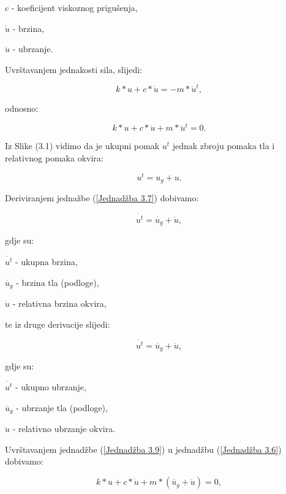 \documentclass[12pt]{book}
\begin{document}
$c$ - koeficijent viskoznog prigušenja,

$\dot{u}$ - brzina,

$\ddot{u}$ - ubrzanje.

\newpage

Uvrštavanjem jednakosti sila, slijedi:

\begin{equation}\label{Jednadžba 3.5}
	k*u + c*\dot{u} = - m*\ddot{u}^t,
\end{equation}

odnosno:

\begin{equation}\label{Jednadžba 3.6}
	k*u + c*\dot{u} + m*\ddot{u}^t =0.
\end{equation}

Iz Slike (3.1) vidimo da je ukupni pomak $u^t$ jednak zbroju pomaka tla i relativnog pomaka okvira:

\begin{equation}\label{Jednadžba 3.7}
	u^t = u_g + u.
\end{equation}

Deriviranjem jednažbe (\ref{Jednadžba 3.7}) dobivamo:

\begin{equation}\label{Jednadžba 3.8}
	\dot{u^t} = \dot{u_g} + \dot{u},
\end{equation}

gdje su:

$\dot{u^t}$ - ukupna brzina,

$\dot{u_g}$ - brzina tla (podloge),

$\dot{u}$ - relativna brzina okvira,

te iz druge derivacije slijedi:

\begin{equation}\label{Jednadžba 3.9}
	\ddot{u^t} = \ddot{u_g} + \ddot{u},
\end{equation}

gdje su:

$\ddot{u^t}$ - ukupno ubrzanje,

$\ddot{u_g}$ - ubrzanje tla (podloge),

$\ddot{u}$ - relativno ubrzanje okvira.

Uvrštavanjem jednadžbe (\ref{Jednadžba 3.9}) u jednadžbu (\ref{Jednadžba 3.6}) dobivamo:

\begin{equation}\label{Jednadžba 3.10}
	k*u + c*\dot{u} + m*(\ddot{u_g} + \ddot{u}) = 0,
\end{equation}
\end{document}
